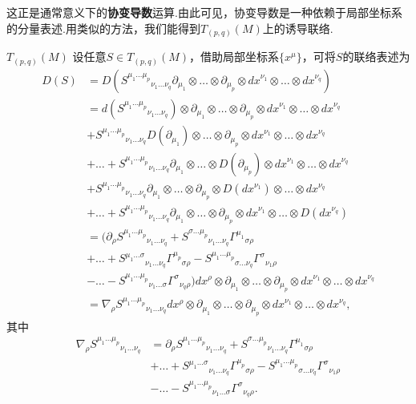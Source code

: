 		这正是通常意义下的\textbf{协变导数}运算.由此可见，协变导数是一种依赖于局部坐标系的分量表述.用类似的方法，我们能得到$T_{(p,q)}(M)$上的诱导联络.
		\begin{definition}
			$T_{(p,q)}(M)$
			设任意$S\in T_{(p,q)}(M)$，借助局部坐标系$\{x^\mu\}$，可将$S$的联络表述为
			\begin{equation}
				\begin{split}
					D(S)&=D({S^{\mu_1\dots\mu_p}}_{\nu_1\dots\nu_q}\partial_{\mu_1}\otimes\dots\otimes\partial_{\mu_p}\otimes{dx}^{\nu_1}\otimes\dots\otimes{dx}^{\nu_q})\\
					&=d({S^{\mu_1\dots\mu_p}}_{\nu_1\dots\nu_q})\otimes\partial_{\mu_1}\otimes\dots\otimes\partial_{\mu_p}\otimes{dx}^{\nu_1}\otimes\dots\otimes{dx}^{\nu_q}\\
					&+{S^{\mu_1\dots\mu_p}}_{\nu_1\dots\nu_q}D(\partial_{\mu_1})\otimes\dots\otimes\partial_{\mu_p}\otimes{dx}^{\nu_1}\otimes\dots\otimes{dx}^{\nu_q}\\
					&+\dots+{S^{\mu_1\dots\mu_p}}_{\nu_1\dots\nu_q}\partial_{\mu_1}\otimes\dots\otimes D({\partial_{\mu_p}})\otimes{dx}^{\nu_1}\otimes\dots\otimes{dx}^{\nu_q}\\
					&+{S^{\mu_1\dots\mu_p}}_{\nu_1\dots\nu_q}\partial_{\mu_1}\otimes\dots\otimes{\partial_{\mu_p}}\otimes D({dx}^{\nu_1})\otimes\dots\otimes{dx}^{\nu_q}\\
					&+\dots+{S^{\mu_1\dots\mu_p}}_{\nu_1\dots\nu_q}\partial_{\mu_1}\otimes\dots\otimes{\partial_{\mu_p}}\otimes{dx}^{\nu_1}\otimes\dots\otimes D({dx}^{\nu_q})\\
					&=(\partial_\rho{S^{\mu_1\dots\mu_p}}_{\nu_1\dots\nu_q}+{S^{\sigma\dots\mu_p}}_{\nu_1\dots\nu_q}{\Gamma^{\mu_1}}_{\sigma\rho}\\
					&+\dots+{S^{\mu_1\dots\sigma}}_{\nu_1\dots\nu_q}{\Gamma^{\mu_p}}_{\sigma\rho}-{S^{\mu_1\dots\mu_p}}_{\sigma\dots\nu_q}{\Gamma^{\sigma}}_{\nu_1\rho}\\
					&-\dots-{S^{\mu_1\dots\mu_p}}_{\nu_1\dots\sigma}{\Gamma^{\sigma}}_{\nu_q\rho})dx^\rho\otimes\partial_{\mu_1}\otimes\dots\otimes\partial_{\mu_p}\otimes{dx}^{\nu_1}\otimes\dots\otimes{dx}^{\nu_q}\\
					&=\nabla_{\rho}{S^{\mu_1\dots\mu_p}}_{\nu_1\dots\nu_q}dx^\rho\otimes\partial_{\mu_1}\otimes\dots\otimes\partial_{\mu_p}\otimes{dx}^{\nu_1}\otimes\dots\otimes{dx}^{\nu_q},
				\end{split}		
			\end{equation}
			其中
			\begin{equation}
				\begin{split}
					\nabla_{\rho}{S^{\mu_1\dots\mu_p}}_{\nu_1\dots\nu_q}&=\partial_\rho{S^{\mu_1\dots\mu_p}}_{\nu_1\dots\nu_q}+{S^{\sigma\dots\mu_p}}_{\nu_1\dots\nu_q}{\Gamma^{\mu_1}}_{\sigma\rho}\\
					&+\dots+{S^{\mu_1\dots\sigma}}_{\nu_1\dots\nu_q}{\Gamma^{\mu_p}}_{\sigma\rho}-{S^{\mu_1\dots\mu_p}}_{\sigma\dots\nu_q}{\Gamma^{\sigma}}_{\nu_1\rho}\\
					&-\dots-{S^{\mu_1\dots\mu_p}}_{\nu_1\dots\sigma}{\Gamma^{\sigma}}_{\nu_q\rho}.
				\end{split}		
			\end{equation}
		\end{definition}
	
	\newpage